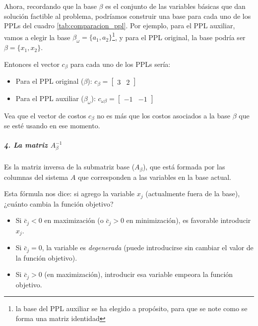 Ahora, recordando que la base \(\beta\) es el conjunto de las variables básicas que dan solución factible al problema, podríamos construir una base para cada uno de los PPLs del cuadro \ref{tab:comparacion_ppl}. Por ejemplo, para el PPL auxiliar, vamos a elegir la base \(\beta_\omega = \{a_1, a_2\}\)\footnote{la base del PPL auxiliar se ha elegido a propósito, para que se note como se forma una matriz identidad}, y para el PPL original, la base podría ser \(\beta = \{x_1, x_2\}\).

Entonces el vector \(c_\beta\) para cada uno de los PPLs sería:
\begin{itemize}
  \item Para el PPL original (\(\beta\)): \(c_\beta = \begin{bmatrix} 3 & 2 \end{bmatrix}\) 
  \item Para el PPL auxiliar (\(\beta_\omega\)): \(c_{\omega\beta} = \begin{bmatrix} -1 & -1 \end{bmatrix}\)
\end{itemize}
\begin{tcolorbox}[remember, title=Aclaración]
  Vea que el vector de costos \(c_\beta\) no es más que los costos asociados a la base \(\beta\) que se esté usando en ese momento.
\end{tcolorbox}

\subparagraph{4. La matriz \(A_\beta^{-1}\)}

Es la matriz inversa de la submatriz base (\(A_\beta\)), que está formada por las columnas del sistema \(A\) que corresponden a las variables en la base actual.


Esta fórmula nos dice: si agrego la variable \(x_j\) (actualmente fuera de la base), ¿cuánto cambia la función objetivo?
\begin{itemize}
  \item Si \(\bar{c}_j < 0\) en maximización (o \(\bar{c}_j > 0\) en minimización), es favorable introducir \(x_j\).
  \item Si \(\bar{c}_j = 0\), la variable es \textit{degenerada} (puede introducirse sin cambiar el valor de la función objetivo).
  \item Si \(\bar{c}_j > 0\) (en maximización), introducir esa variable empeora la función objetivo.
\end{itemize}


